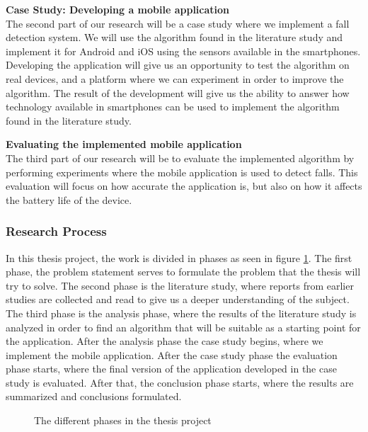 \documentclass[12pt, a4paper, onecolumn]{article}
\newcommand{\parag}[1]{
	\textbf{#1} \hspace{0pt} \\
}
\begin{document}
	\parag{Case Study: Developing a mobile application}
	The second part of our research will be a case study where we implement a fall detection system. We will use the algorithm found in the literature study and implement it for Android and iOS using the sensors available in the smartphones. Developing the application will give us an opportunity to test the algorithm on real devices, and a platform where we can experiment in order to improve the algorithm. The result of the development will give us the ability to answer how technology available in smartphones can be used to implement the algorithm found in the literature study.
	
	\parag{Evaluating the implemented mobile application}
	The third part of our research will be to evaluate the implemented algorithm by performing experiments where the mobile application is used to detect falls. This evaluation will focus on how accurate the application is, but also on how it affects the battery life of the device.
	
	\subsubsection{Research Process}
	
	In this thesis project, the work is divided in phases as seen in figure \ref{fig:research-process}. The first phase, the problem statement serves to formulate the problem that the thesis will try to solve. The second phase is the literature study, where reports from earlier studies are collected and read to give us a deeper understanding of the subject. The third phase is the analysis phase, where the results of the literature study is analyzed in order to find an algorithm that will be suitable as a starting point for the application. After the analysis phase the case study begins, where we implement the mobile application. After the case study phase the evaluation phase starts, where the final version of the application developed in the case study is evaluated. After that, the conclusion phase starts, where the results are summarized and conclusions formulated. 
	
	\begin{figure}[H]
		\centering
		\caption{The different phases in the thesis project}%
		\label{fig:research-process}%
	\end{figure}
	
\end{document}
